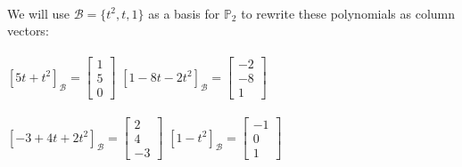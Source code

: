 \documentclass{article}%
\begin{document}
\\
We will use $\mathcal{B} = \{t^2, t, 1\}$ as a basis for $\mathbb{P}_2$ to rewrite these polynomials as column vectors:\\
\\
$[5t + t^2]_\mathcal{B} =
\begin{bmatrix}
    1 \\ 5 \\ 0
\end{bmatrix}$
\hfill
$[1 - 8t - 2t^2]_\mathcal{B} =
\begin{bmatrix}
    -2 \\ -8 \\ 1
\end{bmatrix}$\\
\\
$[-3 + 4t + 2t^2]_\mathcal{B} =
\begin{bmatrix}
    2 \\ 4 \\ -3
\end{bmatrix}$
\hfill
$[1 - t^2]_\mathcal{B} =
\begin{bmatrix}
    -1 \\ 0 \\ 1
\end{bmatrix}$
\end{document}
